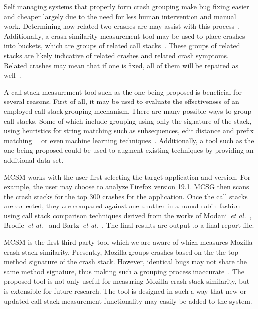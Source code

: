 \documentclass{sig-alternate}
\begin{document}
Self managing systems that properly form crash grouping make bug fixing easier and cheaper largely due to the need for less human intervention and manual work. Determining how related two crashes are may assist with this process~\cite{raey}. Additionally, a crash similarity measurement tool may be used to place crashes into buckets, which are groups of related call stacks~\cite{Seo:2012:PRC:2351676.2351702}. These groups of related stacks are likely indicative of related crashes and related crash symptoms. Related crashes may mean that if one is fixed, all of them will be repaired as well~\cite{Dang:2012:RMC:2337223.2337364}.


A call stack measurement tool such as the one being proposed is beneficial for several reasons. First of all, it may be used to evaluate the effectiveness of an employed call stack grouping mechanism. There are many possible ways to group call stacks. Some of which include grouping using only the signature of the stack, using heuristics for string matching such as subsequences, edit distance and prefix matching~\cite{Brodie2}~\cite{4401026} or even machine learning techniques~\cite{Bartz:2008:FSF:1855895.1855896}. Additionally, a tool such as the one being proposed could be used to augment existing techniques by providing an additional data set.





MCSM works with the user first selecting the target application and version. For example, the user may choose to analyze Firefox version 19.1. MCSG then scans the crash stacks for the top 300 crashes for the application. Once the call stacks are collected, they are compared against one another in a round robin fashion using call stack comparison techniques derived from the works of Modani~\emph{et al.}~\cite{4401026}, Brodie~\emph{et al.}~\cite{raey} and Bartz~\emph{et al.}~\cite{Bartz:2008:FSF:1855895.1855896}. The final results are output to a final report file. 

MCSM is the first third party tool which we are aware of which measures Mozilla crash stack similarity. Presently, Mozilla groups crashes based on the the top method signature of the crash stack. However, identical bugs may not share the same method signature, thus making such a grouping process inaccurate~\cite{Dhaliwal:2011:CFC:2117694.2119726}. The proposed tool is not only useful for measuring Mozilla crash stack similarity, but is extensible for future research. The tool is designed in such a way that new or updated call stack measurement functionality may easily be added to the system. %
\end{document}
